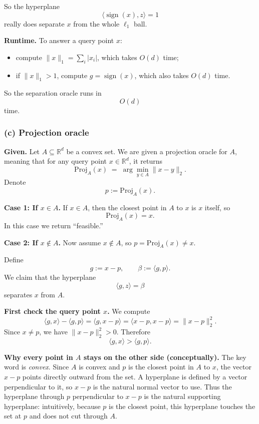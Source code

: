\documentclass[10pt]{article}
\begin{document}
So the hyperplane
\[
\boxed{\langle \operatorname{sign}(x), z\rangle = 1}
\]
really does separate \(x\) from the whole \(\ell_1\) ball.

\medskip
\textbf{Runtime.}
To answer a query point \(x\):
\begin{itemize}
\item compute \(\|x\|_1 = \sum_i |x_i|\), which takes \(O(d)\) time;
\item if \(\|x\|_1>1\), compute \(g=\operatorname{sign}(x)\), which also takes \(O(d)\) time.
\end{itemize}
So the separation oracle runs in
\[
\boxed{O(d)}
\]
time.

\subsubsection*{(c) Projection oracle}

\textbf{Given.}
Let \(A\subseteq \mathbb{R}^d\) be a convex set. We are given a projection oracle for \(A\), meaning that for any query point \(x\in\mathbb{R}^d\), it returns
\[
\mathrm{Proj}_A(x) \;=\; \arg\min_{y\in A}\|x-y\|_2.
\]
Denote
\[
p := \mathrm{Proj}_A(x).
\]

\medskip
\textbf{Case 1: If \(x\in A\).}
If \(x\in A\), then the closest point in \(A\) to \(x\) is \(x\) itself, so
\[
\mathrm{Proj}_A(x)=x.
\]
In this case we return ``feasible.''

\medskip
\textbf{Case 2: If \(x\notin A\).}
Now assume \(x\notin A\), so \(p=\mathrm{Proj}_A(x)\neq x\).

Define
\[
g := x-p,
\qquad
\beta := \langle g,p\rangle.
\]
We claim that the hyperplane
\[
\boxed{\langle g,z\rangle = \beta}
\]
separates \(x\) from \(A\).

\medskip
\textbf{First check the query point \(x\).}
We compute
\[
\langle g,x\rangle - \langle g,p\rangle
=
\langle g, x-p\rangle
=
\langle x-p, x-p\rangle
=
\|x-p\|_2^2.
\]
Since \(x\neq p\), we have \(\|x-p\|_2^2>0\). Therefore
\[
\boxed{\langle g,x\rangle > \langle g,p\rangle.}
\]

\medskip
\textbf{Why every point in \(A\) stays on the other side (conceptually).}
The key word is \emph{convex}. Since \(A\) is convex and \(p\) is the closest point in \(A\) to \(x\), the vector \(x-p\) points directly outward from the set. A hyperplane is defined by a vector perpendicular to it, so \(x-p\) is the natural normal vector to use. Thus the hyperplane through \(p\) perpendicular to \(x-p\) is the natural supporting hyperplane: intuitively, because \(p\) is the closest point, this hyperplane touches the set at \(p\) and does not cut through \(A\).
\end{document}
